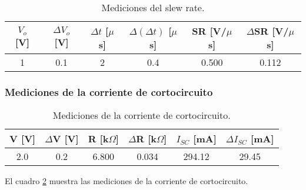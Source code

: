 \begin{table}[h!]
\centering
\begin{tabular}{|c|c|c|c|c|c|}
\hline
$V_o$ [V] & $\Delta V_o$ [V] & $\Delta t$ [$\mu$s] & $\Delta(\Delta t)$ [$\mu$s] & SR [V/$\mu$s] & $\Delta$SR [V/$\mu$s] \\ \hline
1 & 0.1 & 2 & 0.4 & 0.500 & 0.112 \\ \hline
\end{tabular}
\caption{Mediciones del slew rate.}
\label{tab:resultados-slew-rate}
\end{table}


\subsubsection{Mediciones de la corriente de cortocircuito}

\begin{table}[h!]
\centering
\begin{tabular}{|c|c|c|c|c|c|}
\hline
V [V] & $\Delta$V [V] & R [k$\Omega$] & $\Delta$R [k$\Omega$] & $I_{SC}$ [mA] & $\Delta I_{SC}$ [mA] \\ \hline
2.0 & 0.2 & 6.800 & 0.034 & 294.12 & 29.45 \\ \hline
\end{tabular}
\caption{Mediciones de la corriente de cortocircuito.}
\label{tab:resultados-corriente-cortocircuito}
\end{table}

El cuadro \ref{tab:resultados-corriente-cortocircuito} muestra las mediciones de la corriente de cortocircuito.




